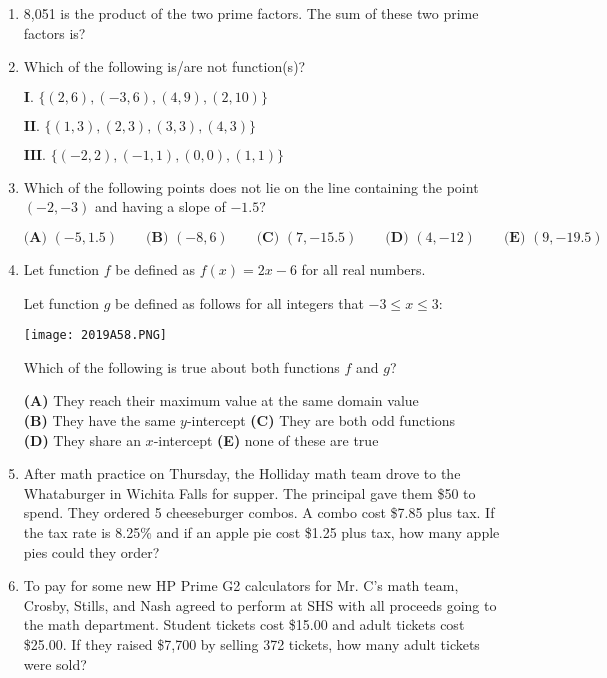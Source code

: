 \documentclass[../uilmath.tex]{subfiles}
\begin{document}
\begin{enumerate}[label=\bfseries\arabic*.]
        \item %
        8,051 is the product of the two prime factors. The sum of these two prime factors is?

        \item %
        Which of the following is/are not function(s)?

        $\textbf{I. } \{(2,6),(-3,6),(4,9),(2,10)\}$

        $\textbf{II. } \{(1,3),(2,3),(3,3),(4,3)\}$

        $\textbf{III. } \{(-2,2),(-1,1),(0,0),(1,1)\}$

        \item %
        Which of the following points does not lie on the line containing the point $(-2,-3)$ and having a slope of $-1.5$?

        $\textbf{(A) } (-5,1.5) \qquad \textbf{(B) } (-8,6) \qquad \textbf{(C) } (7,-15.5) \qquad \textbf{(D) }(4,-12) \qquad \textbf{(E) } (9,-19.5)$

        \item %
        Let function $f$ be defined as $f(x)=2x-6$ for all real numbers.

        Let function $g$ be defined as follows for all integers that $-3\leq x\leq 3$:
        \begin{center}
            \texttt{[image: 2019A58.PNG]}
        \end{center}

        Which of the following is true about both functions $f$ and $g$?

        \textbf{(A) } They reach their maximum value at the same domain value \\
        \textbf{(B) } They have the same $y$-intercept \qquad \textbf{(C) } They are both odd functions \\
        \textbf{(D) } They share an $x$-intercept \qquad \textbf{(E) } none of these are true 

        \item %
        After math practice on Thursday, the Holliday math team drove to the Whataburger in Wichita Falls for supper. The principal 
        gave them \$50 to spend. They ordered 5 cheeseburger combos. A combo cost \$7.85 plus tax. If the tax rate is 8.25\% and if an apple pie cost 
        \$1.25 plus tax, how many apple pies could they order?

        \item %
        To pay for some new HP Prime G2 calculators for Mr. C's math team, Crosby, Stills, and Nash agreed to perform at SHS with all proceeds going to the math 
        department. Student tickets cost \$15.00 and adult tickets cost \$25.00. If they raised \$7,700 by selling 
        372 tickets, how many adult tickets were sold?


\end{enumerate}
\end{document}
